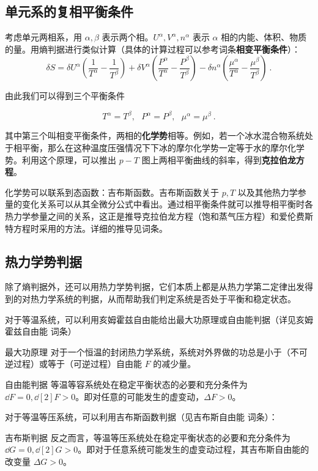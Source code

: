 \subsection{单元系的复相平衡条件}
考虑单元两相系，用 $\alpha,\beta$ 表示两个相。$U^\alpha,V^\alpha,n^\alpha$ 表示 $\alpha$ 相的内能、体积、物质的量。用熵判据进行类似计算（具体的计算过程可以参考词条\textbf{相变平衡条件}）：
\begin{equation}
\delta S=\delta U^\alpha\left(\frac{1}{T^\alpha}-\frac{1}{T^\beta}\right)+\delta V^\alpha\left(\frac{P^\alpha}{T^\alpha}-\frac{P^\beta}{T^\beta}\right)
-\delta n^\alpha\left(\frac{\mu^\alpha}{T^\alpha}-\frac{\mu^\beta}{T^\beta}\right)~.
\end{equation}

由此我们可以得到三个平衡条件

\begin{equation}
T^\alpha=T^\beta,\ \ \ P^\alpha=P^\beta,\ \ \ \mu^\alpha=\mu^\beta~.
\end{equation}

其中第三个叫相变平衡条件，两相的\textbf{化学势}相等。例如，若一个冰水混合物系统处于相平衡，那么在这种温度压强情况下下冰的摩尔化学势一定等于水的摩尔化学势。利用这个原理，可以推出 $p-T$ 图上两相平衡曲线的斜率，得到\textbf{克拉伯龙方程}。

化学势可以联系到态函数：吉布斯函数。吉布斯函数关于 $p,T$ 以及其他热力学参量的变化关系可以从其全微分公式中看出。通过相平衡条件就可以推导相平衡时各热力学参量之间的关系，这正是推导克拉伯龙方程（饱和蒸气压方程）和爱伦费斯特方程时采用的方法。详细的推导见词条。
\subsection{热力学势判据}
除了熵判据外，还可以用热力学势判据，它们本质上都是从热力学第二定律出发得到的对热力学系统的判据，从而帮助我们判定系统是否处于平衡和稳定状态。

对于等温系统，可以利用亥姆霍兹自由能给出最大功原理或自由能判据（详见亥姆霍兹自由能 词条）
\begin{theorem}{最大功原理}
对于一个恒温的封闭热力学系统，系统对外界做的功总是小于（不可逆过程）或等于（可逆过程）自由能 $F$ 的减少量。
\end{theorem}
\begin{theorem}{自由能判据}
等温等容系统处在稳定平衡状态的必要和充分条件为 $\dd F=0,\dd[2]{F}>0$。即对任意的可能发生的虚变动，$\Delta F>0$。
\end{theorem}

对于等温等压系统，可以利用吉布斯函数判据（见吉布斯自由能 词条）：
\begin{theorem}{吉布斯判据}
反之而言，等温等压系统处在稳定平衡状态的必要和充分条件为 
$\dd G=0, \dd[2]{G}>0$。即对于任意系统可能发生的虚变动过程，其吉布斯自由能的改变量 $\Delta G>0$。
\end{theorem}
